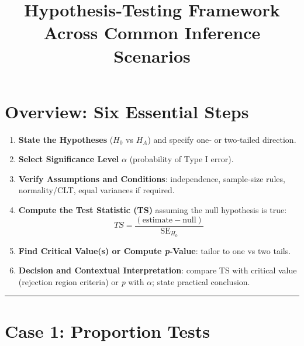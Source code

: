 \documentclass[12pt]{article}
\title{Hypothesis‐Testing Framework Across Common Inference Scenarios}
\date{}
\begin{document}
\maketitle

\section*{Overview: Six Essential Steps}
\begin{enumerate}
  \item \textbf{State the Hypotheses} ($H_0$ vs $H_A$) and specify one‐ or two‐tailed direction.
  \item \textbf{Select Significance Level} $\alpha$ (probability of Type I error).
  \item \textbf{Verify Assumptions and Conditions}: independence, sample‐size rules, normality/CLT, equal variances if required.
  \item \textbf{Compute the Test Statistic (TS)} assuming the null hypothesis is true: $$TS = \frac{(\text{estimate}-\text{null})}{\text{SE}_{H_0}}  $$
  \item \textbf{Find Critical Value(s) or Compute \emph{p}‐Value}: tailor to one vs two tails.
  \item \textbf{Decision and Contextual Interpretation}: compare TS with critical value (rejection region criteria) or \emph{p} with $\alpha$; state practical conclusion.
\end{enumerate}

\bigskip\hrule\bigskip

\section*{Case 1: Proportion Tests}
\end{document}
